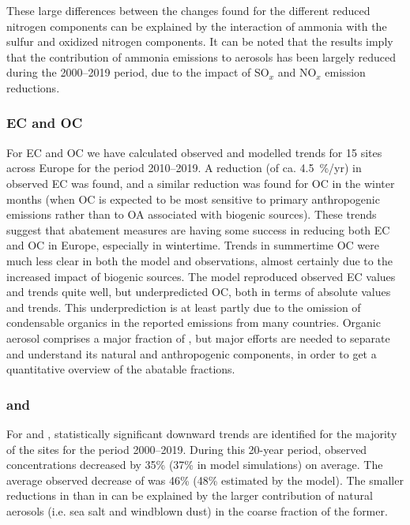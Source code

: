 These large differences between the changes found for the different reduced nitrogen components can be explained by the interaction of ammonia with the sulfur and oxidized nitrogen components. It can be noted that the results imply that the contribution of ammonia emissions to aerosols has been largely reduced during the 2000--2019 period, due to the impact of SO$_x$ and NO$_x$ emission reductions. 




\subsubsection*{EC and OC}
For EC and OC we have calculated observed and modelled trends for 15 sites across Europe for the period 2010--2019. A reduction (of ca. 4.5~\%/yr) in observed EC was found, and a similar reduction was found for OC in the winter months (when OC is expected to be most sensitive to primary anthropogenic emissions rather than to OA associated with biogenic sources). These trends suggest that abatement measures are having some success in reducing both EC and OC in Europe, especially in wintertime. 
Trends in summertime OC were much less clear in both the model and observations, almost certainly due to the increased impact of biogenic sources.
The model reproduced observed EC values and trends quite well, but underpredicted OC, both in terms of absolute values and trends. This underprediction is at least partly due to the omission of condensable organics in the reported emissions from many countries. 
Organic aerosol comprises a major fraction of \pmfine, but major efforts are needed to separate and understand its natural and anthropogenic components, in order to get a quantitative overview of the abatable fractions.
%
\subsubsection*{\PM[10] and \PM[2.5]}
For \PM[10] and \PM[2.5], statistically significant downward trends are identified for the majority of the sites for the period 2000--2019.
During this 20-year period, observed \PM[10] concentrations decreased by 35\%  (37\% in model simulations) on average. 
The average observed decrease of \PM[2.5] was 46\%  (48\% estimated by the model). The smaller reductions in \PM[10] than in \PM[2.5] can be explained by the larger contribution of natural aerosols (i.e. sea salt and windblown dust) in the coarse fraction of the former. 

